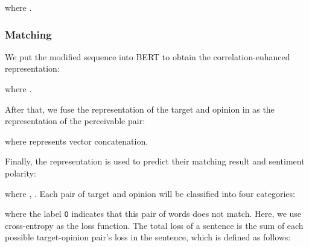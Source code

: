 \documentclass[11pt]{article}
\begin{document}
where  .
\subsubsection{Matching} 
We put the modified sequence  into BERT 
to obtain the correlation-enhanced representation:

where .

After that, we fuse the representation of the target  and opinion  in  as the representation of the perceivable pair:

where  represents vector concatenation.

Finally, the representation  is used to predict their matching result and sentiment polarity:

where , . Each pair of target and opinion will be classified into four categories:

where the label \texttt{O} indicates that this pair of words does not match.
Here, we use cross-entropy as the loss function. The total loss of a sentence is the sum of each possible target-opinion pair's loss in the sentence, which is defined as follows:
\end{document}
